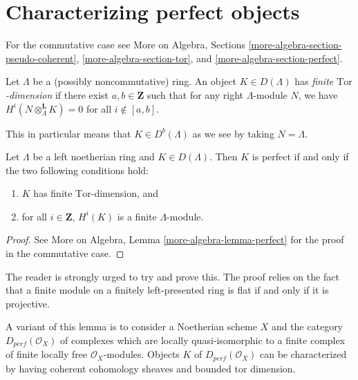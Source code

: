 \section{Characterizing perfect objects}
\label{section-characterizing-perfect}

\noindent
For the commutative case see
More on Algebra, Sections
\ref{more-algebra-section-pseudo-coherent},
\ref{more-algebra-section-tor}, and
\ref{more-algebra-section-perfect}.

\begin{definition}
\label{definition-finite-tor-dimension}
Let $\Lambda$ be a (possibly noncommutative) ring.
An object $K\in D(\Lambda)$ has {\it finite $\text{Tor}$-dimension}
if there exist $a, b \in \mathbf{Z}$ such that for any
right $\Lambda$-module $N$, we have
$H^i(N \otimes_{\Lambda}^\mathbf{L} K) = 0$ for all
$i \not \in [a, b]$.
\end{definition}

\noindent
This in particular means that $K \in D^b(\Lambda)$ as we see by taking
$N = \Lambda$.

\begin{lemma}
\label{lemma-characterize-perfect}
Let $\Lambda$ be a left noetherian ring and $K\in D(\Lambda)$. Then $K$ is
perfect if and only if the two following conditions hold:
\begin{enumerate}
\item
$K$ has finite $\text{Tor}$-dimension, and
\item
for all $i \in \mathbf{Z}$, $H^i(K)$ is a finite $\Lambda$-module.
\end{enumerate}
\end{lemma}

\begin{proof}
See More on Algebra, Lemma \ref{more-algebra-lemma-perfect}
for the proof in the commutative case.
\end{proof}

\noindent
The reader is strongly urged to try and prove this. The proof relies on the
fact that a finite module on a finitely left-presented ring is flat if and only
if it is projective.

\begin{remark}
\label{remark-variant}
A variant of this lemma is to consider a Noetherian scheme $X$
and the category $D_{perf}(\mathcal{O}_X)$ of complexes which are locally
quasi-isomorphic to a finite complex of finite locally free
$\mathcal{O}_X$-modules. Objects $K$ of $D_{perf}(\mathcal{O}_X)$
can be characterized by having coherent cohomology sheaves and
bounded tor dimension.
\end{remark}









